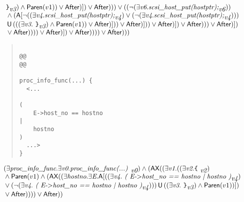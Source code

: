 \documentclass{article}
\newcommand{\U}{\,\mbox{\sf{U}}\,}
\newcommand{\A}{\mbox{\sf{A}}}
\newcommand{\AX}{\mbox{\sf{AX}}}
\newcommand{\mita}[1]{\mbox{\it{{#1}}}}
\newcommand{\msf}[1]{\mbox{\sf{{#1}}}}
\newcommand{\mth}[1]{\({#1}\)}
\newcommand{\ttlb}{\mbox{\tt \char'173}}
\newcommand{\ttrb}{\mbox{\tt \char'175}}
\begin{document}
\[\begin{array}{l}
{{\ttrb}}_{\mita{v3}}) \wedge \msf{Paren}(v1)) \vee \msf{After})]
) \vee \msf{After}))) \vee ((\neg (\exists \mita{v6} . \mita{scsi\_host\_put(hostptr);}_{\mita{v6}}))\\\mbox{} \wedge (\A[\neg ((\exists \mita{v4} . \mita{scsi\_host\_put(hostptr);}_{\mita{v4}}) \vee (\neg (\exists \mita{v4} . \mita{scsi\_host\_put(hostptr);}_{\mita{v4}})))\\\mbox{} \U (((\exists \mita{v3} . \mita{
{\ttrb}}_{\mita{v3}}) \wedge \msf{Paren}(v1)) \vee \msf{After})]
)) \vee \msf{After})]
)) \vee \msf{After})]
) \vee \msf{After}))) \vee \msf{After})]
)\\\mbox{} \vee \msf{After})))) \vee \msf{After})]
) \vee \msf{After})))) \vee \msf{After})))
\end{array}\]

\begin{quote}\begin{verbatim}

@@
@@

proc_info_func(...) {
  <...
    
(
    E->host_no == hostno
|
    hostno
)
  ...>
}
\end{verbatim}\end{quote}

\[\begin{array}{l}
(\exists \mita{proc\_info\_func} . \exists \mita{v0} . \mita{proc\_info\_func(...) }_{\mita{v0}}) \wedge (\AX((\exists \mita{v1} . ((\exists \mita{v2} . \mita{{\ttlb}
  }_{\mita{v2}})\\\mbox{} \wedge \msf{Paren}(v1) \wedge (\AX((\exists \mita{hostno} . \exists \mita{E} . \A[((\exists \mita{v4} . \mita{
(
E-\mth{>}host\_no == hostno
|
hostno
)}_{\mita{v4}})\\\mbox{} \vee (\neg (\exists \mita{v4} . \mita{
(
E-\mth{>}host\_no == hostno
|
hostno
)}_{\mita{v4}}))) \U ((\exists \mita{v3} . \mita{
{\ttrb}}_{\mita{v3}}) \wedge \msf{Paren}(v1))]
)\\\mbox{} \vee \msf{After})))) \vee \msf{After}))
\end{array}\]
\end{document}
